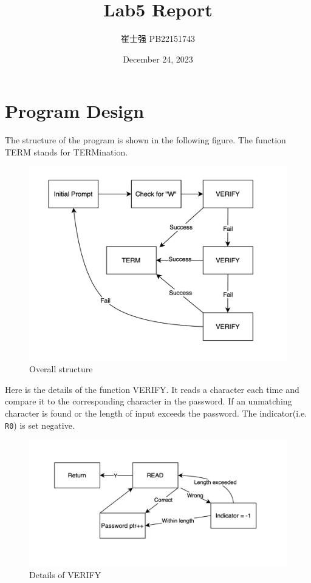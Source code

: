 \documentclass[UTF8]{ctexart}
\title{Lab5 Report}
\author{崔士强 PB22151743}
\date{December 24, 2023}
\begin{document}
\maketitle
\section{Program Design}
The structure of the program is shown in the following figure. 
The function TERM stands for TERMination.
\begin{figure}[H]
  \centering
  \includegraphics[scale=0.5]{Overall.png}
  \caption{Overall structure}
\end{figure}

Here is the details of the function VERIFY. It reads a character each time and
compare it to the corresponding character in the password. 
If an unmatching character is found or the length of input
exceeds the password. The indicator(i.e. \lstinline{R0}) is set negative.
\begin{figure}[H]
  \centering
  \includegraphics[scale=0.5]{Verify.png}
  \caption{Details of VERIFY}
\end{figure}
\end{document}
